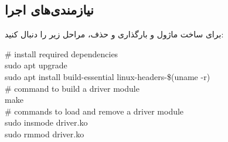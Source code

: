 \documentclass[12pt]{article}
\begin{document}
	\subsection{نیازمندی‌های اجرا}
	برای ساخت ماژول و بارگذاری و حذف، مراحل زیر را دنبال کنید:
	
	\begin{english}
		\noindent
		\# install required dependencies \\
		sudo apt upgrade \\
		sudo apt install build-essential linux-headers-\$(uname -r) \\
		\# command to build a driver module \\
		make \\
		\# commands to load and remove a driver module \\
		sudo insmode driver.ko \\
		sudo rmmod driver.ko
	\end{english}
	
\end{document}
